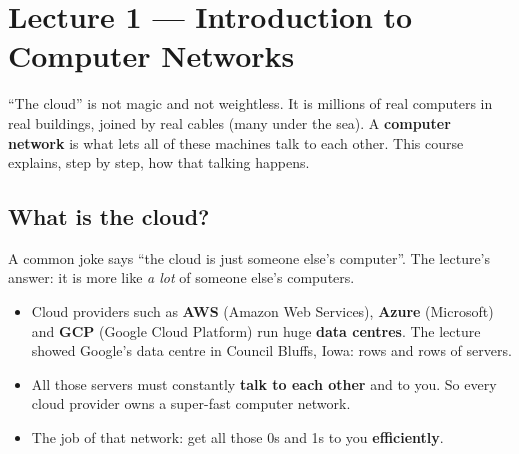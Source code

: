 \chapter{Lecture 1 --- Introduction to Computer Networks}

\begin{keyidea}
``The cloud'' is not magic and not weightless. It is millions of real computers in real buildings, joined by real cables (many under the sea). A \textbf{computer network} is what lets all of these machines talk to each other. This course explains, step by step, how that talking happens.
\end{keyidea}

\section{What is the cloud?}

A common joke says ``the cloud is just someone else's computer''. The lecture's answer: it is more like \emph{a lot} of someone else's computers.

\begin{itemize}
  \item Cloud providers such as \textbf{AWS} (Amazon Web Services), \textbf{Azure} (Microsoft) and \textbf{GCP} (Google Cloud Platform) run huge \textbf{data centres}. The lecture showed Google's data centre in Council Bluffs, Iowa: rows and rows of servers.
  \item All those servers must constantly \textbf{talk to each other} and to you. So every cloud provider owns a super-fast computer network.
  \item The job of that network: get all those 0s and 1s to you \textbf{efficiently}.
\end{itemize}

\begin{center}
\end{center}

